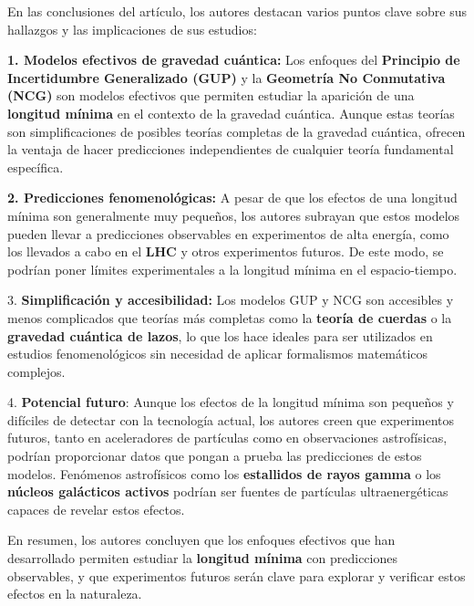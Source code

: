En las conclusiones del artículo, los autores destacan varios puntos clave sobre sus hallazgos y las implicaciones de sus estudios:

 \textbf{1. Modelos efectivos de gravedad cuántica:} Los enfoques del \textbf{Principio de Incertidumbre Generalizado (GUP)} y la \textbf{Geometría No Conmutativa (NCG)} son modelos efectivos que permiten estudiar la aparición de una \textbf{longitud mínima} en el contexto de la gravedad cuántica. Aunque estas teorías son simplificaciones de posibles teorías completas de la gravedad cuántica, ofrecen la ventaja de hacer predicciones independientes de cualquier teoría fundamental específica.

\textbf{2. Predicciones fenomenológicas:} A pesar de que los efectos de una longitud mínima son generalmente muy pequeños, los autores subrayan que estos modelos pueden llevar a predicciones observables en experimentos de alta energía, como los llevados a cabo en el \textbf{LHC} y otros experimentos futuros. De este modo, se podrían poner límites experimentales a la longitud mínima en el espacio-tiempo.

3. \textbf{Simplificación y accesibilidad:} Los modelos GUP y NCG son accesibles y menos complicados que teorías más completas como la \textbf{teoría de cuerdas} o la \textbf{gravedad cuántica de lazos}, lo que los hace ideales para ser utilizados en estudios fenomenológicos sin necesidad de aplicar formalismos matemáticos complejos.

4. \textbf{Potencial futuro}: Aunque los efectos de la longitud mínima son pequeños y difíciles de detectar con la tecnología actual, los autores creen que experimentos futuros, tanto en aceleradores de partículas como en observaciones astrofísicas, podrían proporcionar datos que pongan a prueba las predicciones de estos modelos. Fenómenos astrofísicos como los \textbf{estallidos de rayos gamma} o los \textbf{núcleos galácticos activos} podrían ser fuentes de partículas ultraenergéticas capaces de revelar estos efectos.

En resumen, los autores concluyen que los enfoques efectivos que han desarrollado permiten estudiar la \textbf{longitud mínima} con predicciones observables, y que experimentos futuros serán clave para explorar y verificar estos efectos en la naturaleza.